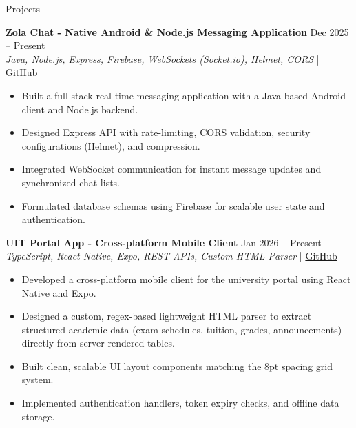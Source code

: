 \documentclass{resume}
\begin{document}

\begin{rSection}{Projects}
    \vspace{-2pt}

    \item \textbf{Zola Chat - Native Android \& Node.js Messaging Application} \hfill {Dec 2025 -- Present}\\
    {\small \textit{Java, Node.js, Express, Firebase, WebSockets (Socket.io), Helmet, CORS} \hfill | \href{https://github.com/pckienuit/DoAn_ZaloClone}{GitHub}}
    \begin{itemize}
        \itemsep -5pt {}
        \item Built a full-stack real-time messaging application with a Java-based Android client and Node.js backend.
        \item Designed Express API with rate-limiting, CORS validation, security configurations (Helmet), and compression.
        \item Integrated WebSocket communication for instant message updates and synchronized chat lists.
        \item Formulated database schemas using Firebase for scalable user state and authentication.
    \end{itemize}

    \item \textbf{UIT Portal App - Cross-platform Mobile Client} \hfill {Jan 2026 -- Present}\\
    {\small \textit{TypeScript, React Native, Expo, REST APIs, Custom HTML Parser} \hfill | \href{https://github.com/pckienuit/uit-portal-app}{GitHub}}
    \begin{itemize}
        \itemsep -5pt {}
        \item Developed a cross-platform mobile client for the university portal using React Native and Expo.
        \item Designed a custom, regex-based lightweight HTML parser to extract structured academic data (exam schedules, tuition, grades, announcements) directly from server-rendered tables.
        \item Built clean, scalable UI layout components matching the 8pt spacing grid system.
        \item Implemented authentication handlers, token expiry checks, and offline data storage.
    \end{itemize}


\end{rSection}
\end{document}
